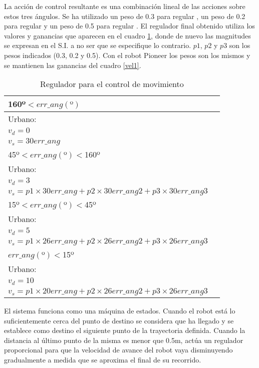 La acción de control resultante es una combinación lineal de las acciones sobre estos tres ángulos. Se ha utilizado un peso de 0.3 para regular , un peso de 0.2 para regular  y un peso de 0.5 para regular . El regulador final obtenido utiliza los valores y ganancias que aparecen en el cuadro \ref{vel2}, donde de nuevo las magnitudes se expresan en el S.I. a no ser que se especifique lo contrario. $p1$, $p2$ y $p3$ son los pesos indicados (0.3, 0.2 y 0.5).
Con el robot Pioneer los pesos son los mismos y se mantienen las ganancias del cuadro \ref{vel1}.

\begin{table}[hbt]
\begin{center}
\caption{Regulador para el control de movimiento}
\label{vel2}

\vspace{5mm}

\begin{tabular}{ll}
\hline\hline
160º$<err\_ang(º)$ \\ \hline
Urbano:\\
$v_{d}=0$ \\
$v_{s}=30err\_ang$\\
\hline
  45º$<err\_ang(º)<$160º \\ \hline
Urbano:\\
   $v_{d}=3$ \\
  $v_{s}=p1\times30err\_ang + p2\times30err\_ang2 + p3\times30err\_ang3$ \\
\hline
15º$<err\_ang(º)<$45º \\ \hline
Urbano:\\
$v_{d}=5$ \\
$v_{s}=p1\times26err\_ang + p2\times26err\_ang2 + p3\times26err\_ang3$\\
\hline
$err\_ang(º)<$15º \\ \hline
Urbano: \\
$v_{d}=10$\\
 $v_{s}=p1\times20err\_ang + p2\times26err\_ang2 + p3\times26err\_ang3$\\
\hline\hline
\end{tabular}
\end{center}
\end{table}

El sistema funciona como una máquina de estados. Cuando el robot está lo suficientemente cerca del punto de destino se considera que ha llegado y se establece como destino el siguiente punto de la trayectoria definida. Cuando la distancia al último punto de la misma es menor que 0.5m, actúa un regulador proporcional para que la velocidad de avance del robot vaya disminuyendo gradualmente a medida que se aproxima el final de su recorrido.

